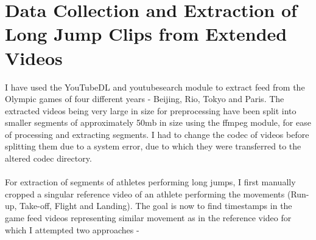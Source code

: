 \documentclass[12pt, letterpaper]{article}
\begin{document}
 \section{Data Collection and Extraction of Long Jump Clips from Extended Videos}
I have used the YouTubeDL and youtubesearch module to extract feed from
the Olympic games of four different years - Beijing, Rio, Tokyo and Paris.
The extracted videos being very large in size for preprocessing have been split
into smaller segments of approximately 50mb in size using the ffmpeg module,
 for ease of processing and extracting segments. I had to change the codec of videos before splitting them due to a system error, due to which they were transferred to the altered codec directory.
 \\\\For extraction of segments of athletes performing long jumps, 
 I first manually cropped a singular reference video of an athlete performing 
 the movements (Run-up, Take-off, Flight and Landing). The goal is now to find timestamps
 in the game feed videos representing similar movement as in the reference video for which I attempted two approaches - 
\end{document}
